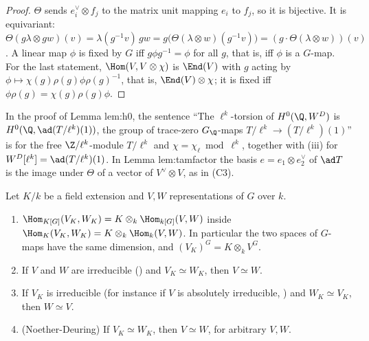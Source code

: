 \begin{proof}
$\Theta$ sends $e_i^\vee\otimes f_j$ to the matrix unit mapping $e_i$ to $f_j$, so it is bijective. It is equivariant:
$\Theta(g\lambda\otimes gw)(v)=\lambda(g^{-1}v)\,gw=g\bigl(\Theta(\lambda\otimes w)(g^{-1}v)\bigr)=(g\cdot\Theta(\lambda\otimes w))(v)$. A linear map $\phi$ is
fixed by $G$ iff $g\phi g^{-1}=\phi$ for all $g$, that is, iff $\phi$ is a $G$-map. For the last statement, $\Hom(V,V\otimes\chi)$ is $\End(V)$ with
$g$ acting by $\phi\mapsto\chi(g)\rho(g)\phi\rho(g)^{-1}$, that is, $\End(V)\otimes\chi$; it is fixed iff $\phi\rho(g)=\chi(g)\rho(g)\phi$.
\end{proof}

\begin{paperlink}
In the proof of Lemma lem:h0, the sentence ``The $\ell^k$-torsion of $H^0(\Q,W^D)$ is $H^0(\Q,\ad(T/\ell^k)(1))$, the group of
trace-zero $G_\Q$-maps $T/\ell^k\to(T/\ell^k)(1)$'' is  for the free $\Z/\ell^k$-module $T/\ell^k$ and $\chi=\chi_\ell\bmod\ell^k$, together with
(iii) for $W^D[\ell^k]=\ad(T/\ell^k)(1)$. In Lemma lem:tamfactor the basis $e=e_1\otimes e_2^\vee$ of $\ad T$ is the image
under $\Theta$ of a vector of $V^\vee\otimes V$, as in (C3).
\end{paperlink}

\begin{proposition}\label{prop:reps:scalars}
Let $K/k$ be a field extension and $V,W$ representations of $G$ over $k$.
\begin{enumerate}[label=(\roman*)]
\item $\Hom_{K[G]}(V_K,W_K)=K\otimes_k\Hom_{k[G]}(V,W)$ inside $\Hom_K(V_K,W_K)=K\otimes_k\Hom_k(V,W)$. In particular the two spaces of $G$-maps
have the same dimension, and $(V_K)^G=K\otimes_kV^G$.
\item If $V$ and $W$ are irreducible () and $V_K\simeq W_K$, then $V\simeq W$.
\item If $V_K$ is irreducible (for instance if $V$ is absolutely irreducible, ) and $W_K\simeq V_K$, then $W\simeq V$.
\item (Noether-Deuring) If $V_K\simeq W_K$, then $V\simeq W$, for arbitrary $V,W$.
\end{enumerate}
\end{proposition}

